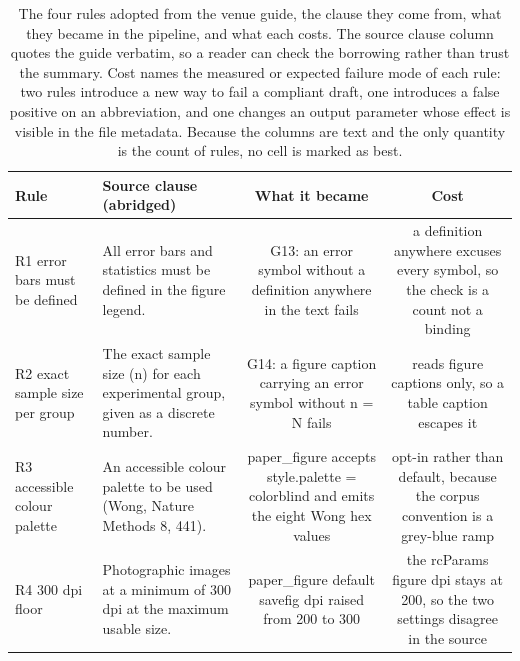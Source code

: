 \begin{table}[t]
\centering
\caption{The four rules adopted from the venue guide, the clause they come from, what they became in the pipeline, and what each costs. The source clause column quotes the guide verbatim, so a reader can check the borrowing rather than trust the summary. Cost names the measured or expected failure mode of each rule: two rules introduce a new way to fail a compliant draft, one introduces a false positive on an abbreviation, and one changes an output parameter whose effect is visible in the file metadata. Because the columns are text and the only quantity is the count of rules, no cell is marked as best.}
\label{tab:tab-rules}
\begin{tabular}{llcc}
\toprule
\textbf{Rule} & \textbf{Source clause (abridged)} & \textbf{What it became} & \textbf{Cost} \\
\midrule
R1 error bars must be defined & All error bars and statistics must be defined in the figure legend. & G13: an error symbol without a definition anywhere in the text fails & a definition anywhere excuses every symbol, so the check is a count not a binding \\
R2 exact sample size per group & The exact sample size (n) for each experimental group, given as a discrete number. & G14: a figure caption carrying an error symbol without n = N fails & reads figure captions only, so a table caption escapes it \\
R3 accessible colour palette & An accessible colour palette to be used (Wong, Nature Methods 8, 441). & paper_figure accepts style.palette = colorblind and emits the eight Wong hex values & opt-in rather than default, because the corpus convention is a grey-blue ramp \\
R4 300 dpi floor & Photographic images at a minimum of 300 dpi at the maximum usable size. & paper_figure default savefig dpi raised from 200 to 300 & the rcParams figure dpi stays at 200, so the two settings disagree in the source \\
\bottomrule
\end{tabular}
\end{table}
